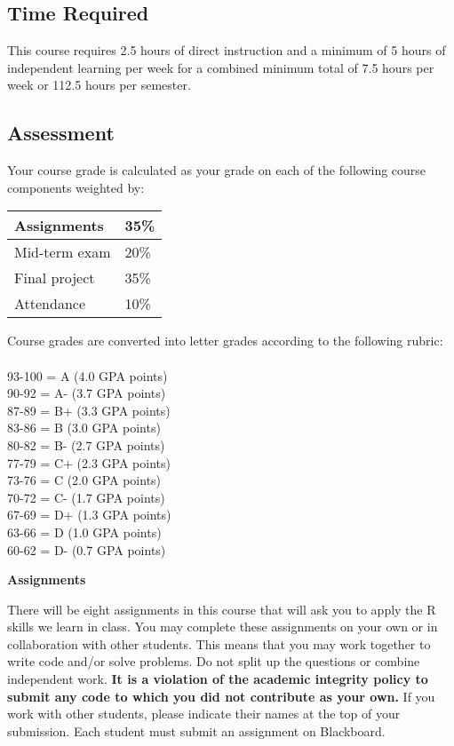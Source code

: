 \documentclass[12pt,letterpaper]{article}
\begin{document}
\subsection*{Time Required}

This course requires 2.5 hours of direct instruction and a minimum of 5 hours of independent learning per week for a combined minimum total of 7.5 hours per week or 112.5 hours per semester.

\subsection*{Assessment}

Your course grade is calculated as your grade on each of the following course components weighted by:

\begin{tabular}{l|l}
Assignments & 35\% \\
\hline
Mid-term exam & 20\% \\
\hline
Final project & 35\% \\
\hline
Attendance & 10\%
\end{tabular}

Course grades are converted into letter grades according to the following rubric:\\
\\
93-100 = A (4.0 GPA points)\\
90-92 = A- (3.7 GPA points)\\
87-89 = B+ (3.3 GPA points)\\
83-86 = B (3.0 GPA points)\\
80-82 = B- (2.7 GPA points)\\
77-79 = C+ (2.3 GPA points)\\
73-76 = C (2.0 GPA points)\\
70-72 = C- (1.7 GPA points)\\
67-69 = D+ (1.3 GPA points)\\
63-66 = D (1.0 GPA points) \\
60-62 = D- (0.7 GPA points)

\textbf{Assignments}

There will be eight assignments in this course that will ask you to apply the R skills we learn in class. You may complete these assignments on your own or in collaboration with other students. This means that you may work together to write code and/or solve problems. Do not split up the questions or combine independent work. \textbf{It is a violation of the academic integrity policy to submit any code to which you did not contribute as your own.} If you work with other students, please indicate their names at the top of your submission. Each student must submit an assignment on Blackboard. \par
\end{document}
